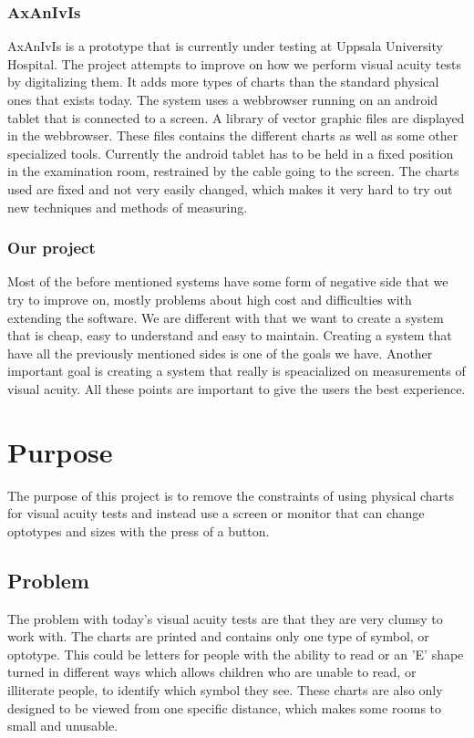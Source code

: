\documentclass[12pt,a4paper,notitlepage]{report}
\begin{document}
\subsubsection{AxAnIvIs}
AxAnIvIs is a prototype that is currently under testing at Uppsala University Hospital. The project attempts to improve on how we perform visual acuity tests by digitalizing them. It adds more types of charts than the standard physical ones that exists today. The system uses a webbrowser running on an android tablet that is connected to a screen. A library of vector graphic files are displayed in the webbrowser. These files contains the different charts as well as some other specialized tools. Currently the android tablet has to be held in a fixed position in the examination room, restrained by the cable going to the screen. The charts used are fixed and not very easily changed, which makes it very hard to try out new techniques and methods of measuring.

\subsubsection{Our project}
Most of the before mentioned systems have some form of negative side that we try to improve on, mostly problems about high cost and difficulties with extending the software. We are different with that we want to create a system that is cheap, easy to understand and easy to maintain. Creating a system that have all the previously mentioned sides is one of the goals we have. Another important goal is creating a system that really is speacialized on measurements of visual acuity. All these points are important to give the users the best experience.

\section{Purpose}
The purpose of this project is to remove the constraints of using physical charts for visual acuity tests and instead use a screen or monitor that can change optotypes and sizes with the press of a button.

\subsection{Problem}
The problem with today's visual acuity tests are that they are very clumsy to work with. The charts are printed and contains only one type of symbol, or optotype. This could be letters for people with the ability to read or an 'E' shape turned in different ways which allows children who are unable to read, or illiterate people, to identify which symbol they see. These charts are also only designed to be viewed from one specific distance, which makes some rooms to small and unusable.
\end{document}
